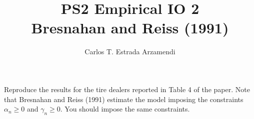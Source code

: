 \documentclass[12pt]{article}
\title{\vspace{-2cm}\textbf{PS2 Empirical IO 2}\\
Bresnahan and Reiss (1991)}
\author{Carlos T. Estrada Arzamendi}
\begin{document}
\maketitle

\section{}
Reproduce the results for the tire dealers reported in Table 4 of the paper. Note that
Bresnahan and Reiss (1991) estimate the model imposing the constraints $\alpha_n \geq 0$  and
$\gamma_n \geq 0$. You should impose the same constraints.
\end{document}
